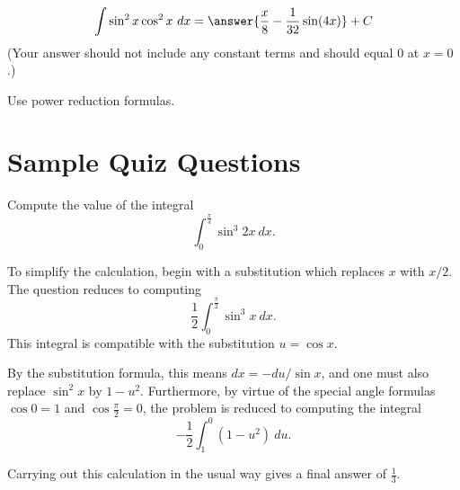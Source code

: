 \documentclass{ximera}
\begin{document}
\begin{exercise}%
\[ \int \sin^2 x\cos^2 x\ dx = \answer{\frac{x}{8}-\frac{1}{32} \sin (4 x)}+ C \]
(Your answer should not include any constant terms and should equal $0$ at $x = 0$.)
\begin{hint}
Use power reduction formulas.
\end{hint}
%
%
\end{exercise}


\section*{Sample Quiz Questions}

\begin{question}%

Compute the value of the integral
\[\int_{0}^{\frac{\pi}{4}} \sin^{3} 2x ~dx.\]
\begin{multiplechoice}
\end{multiplechoice}
\begin{feedback}
To simplify the calculation, begin with a substitution which replaces \(x\) with \(x/2\). The question reduces to computing
\[\frac{1}{2}\int_{0}^{\frac{\pi}{2}} \sin^{3} x ~dx.\]
This integral is compatible with the substitution \(u = \cos x\). \begin{hint} By the substitution formula, this means \(dx = - du / \sin x\), and one must also replace \(\sin^2 x\) by \(1 - u^2\). Furthermore, by virtue of the special angle formulas \(\cos 0 = 1\) and \(\cos \frac{\pi}{2} = 0\), the problem is reduced to computing the integral
\[-\frac{1}{2}\int_{1}^{0} (1 - u^2) ~du.\]
\begin{hint}
Carrying out this calculation in the usual way gives a final answer of \(\frac{1}{3}\).
\end{hint}
\end{hint}
\end{feedback}

\end{question}
\end{document}
